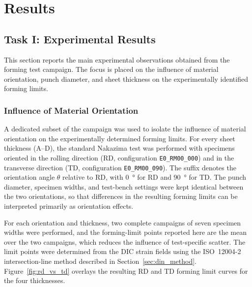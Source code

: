 \chapter{Results}
\label{chap:results}

\section{Task I: Experimental Results}
\label{sec:results_task1}
This section reports the main experimental observations obtained from the
forming test campaign. The focus is placed on the influence of material
orientation, punch diameter, and sheet thickness on the experimentally
identified forming limits.


\subsection{Influence of Material Orientation}
\label{sec:orientation_influence}

A dedicated subset of the campaign was used to isolate the influence of
material orientation on the experimentally determined forming limits. For
every sheet thickness (A--D), the standard Nakazima test was performed with
specimens oriented in the rolling direction (RD, configuration
\texttt{E0\_RM00\_000}) and in the transverse direction (TD, configuration
\texttt{E0\_RM00\_090}). The suffix denotes the orientation
angle $\theta$ relative to RD, with \SI{0}{\degree} for RD and
\SI{90}{\degree} for TD. The punch diameter, specimen widths, and test-bench
settings were kept identical between the two orientations, so that
differences in the resulting forming limits can be interpreted primarily as
orientation effects.

For each orientation and thickness, two complete campaigns of seven specimen
widths were performed, and the forming-limit points reported here are the mean
over the two campaigns, which reduces the influence of test-specific scatter.
The limit points were determined from
the DIC strain fields using the ISO~12004-2 intersection-line method
described in Section~\ref{sec:din_method}. Figure~\ref{fig:rd_vs_td} overlays the resulting RD and TD forming
limit curves for the four thicknesses.

